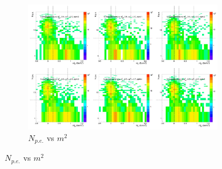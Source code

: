 \begin{figure}[H]
  \centering
    \begin{subfigure}{1\textwidth}
   \centering
   \includegraphics[width=0.94\textwidth]{hiptfits/neg/PSaccthreshold_cent0_ich0_accfire0_ptbin10.jpg}
    \caption{$N_{p.e.}$ vs $m^2$}
    \end{subfigure}
\end{figure}
